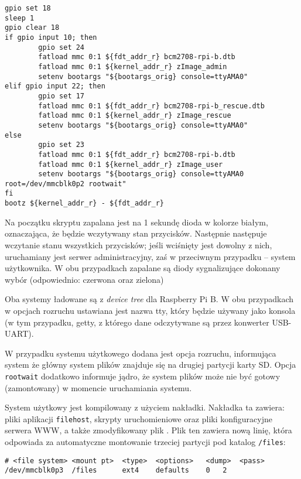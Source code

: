 \documentclass[10pt,a4paper]{article}
\begin{document}
\begin{lstlisting}[caption=Zawartość skryptu uruchomieniowego]
gpio set 18
sleep 1
gpio clear 18
if gpio input 10; then
        gpio set 24
        fatload mmc 0:1 ${fdt_addr_r} bcm2708-rpi-b.dtb
        fatload mmc 0:1 ${kernel_addr_r} zImage_admin
        setenv bootargs "${bootargs_orig} console=ttyAMA0"
elif gpio input 22; then
        gpio set 17
        fatload mmc 0:1 ${fdt_addr_r} bcm2708-rpi-b_rescue.dtb
        fatload mmc 0:1 ${kernel_addr_r} zImage_rescue
        setenv bootargs "${bootargs_orig} console=ttyAMA0"
else
        gpio set 23
        fatload mmc 0:1 ${fdt_addr_r} bcm2708-rpi-b.dtb
        fatload mmc 0:1 ${kernel_addr_r} zImage_user
        setenv bootargs "${bootargs_orig} console=ttyAMA0 root=/dev/mmcblk0p2 rootwait"
fi
bootz ${kernel_addr_r} - ${fdt_addr_r}
\end{lstlisting}
Na początku skryptu zapalana jest na 1 sekundę dioda w kolorze białym, oznaczająca, że będzie
wczytywany stan przycisków. Następnie następuje wczytanie stanu wszystkich przycisków; jeśli
wciśnięty jest dowolny z nich, uruchamiany jest serwer administracyjny, zaś w przeciwnym
przypadku -- system użytkownika. W obu przypadkach zapalane są diody sygnalizujące dokonany
wybór (odpowiednio: czerwona oraz zielona)

Oba systemy ładowane są z \emph{device tree} dla Raspberry Pi B. W obu przypadkach w opcjach
rozruchu ustawiana jest nazwa tty, który będzie używany jako konsola (w tym przypadku, getty,
z którego dane odczytywane są przez konwerter USB-UART).

W przypadku systemu użytkowego dodana jest opcja rozruchu, informująca system że główny
system plików znajduje się na drugiej partycji karty SD. Opcja \texttt{rootwait} dodatkowo
informuje jądro, że system plików może nie być gotowy (zamontowany) w momencie uruchamiania
systemu.

System użytkowy jest kompilowany z użyciem nakładki. Nakładka ta zawiera: pliki aplikacji
\texttt{filehost}, skrypty uruchomieniowe oraz pliki konfiguracyjne serwera WWW, a także
zmodyfikowany plik . Plik ten zawiera nową linię, która odpowiada
za automatyczne montowanie trzeciej partycji pod katalog \texttt{/files}:
\begin{lstlisting}[caption=Linia dodana do pliku \directory{/etc/fstab}]
# <file system>	<mount pt>	<type>	<options>	<dump>	<pass>
/dev/mmcblk0p3	/files		ext4	defaults	0	2
\end{lstlisting}
\end{document}
